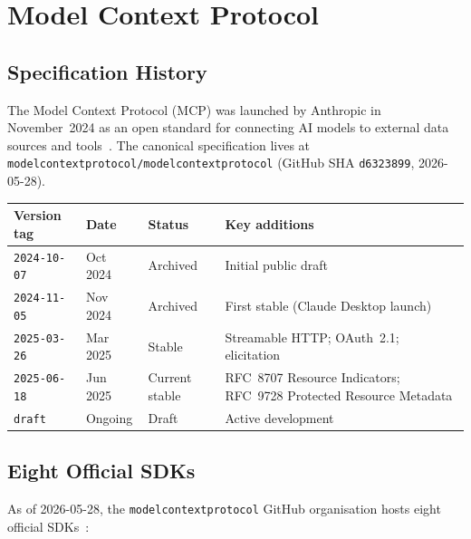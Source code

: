 \section{Model Context Protocol}
\label{sec:mcp}

\subsection{Specification History}
\label{ssec:mcp-spec}

The Model Context Protocol (MCP) was launched by Anthropic in November~2024
as an open standard for connecting AI models to external data sources and
tools~\cite{mcp_ecosystem_deep}.  The canonical specification lives at
\texttt{modelcontextprotocol/modelcontextprotocol}
(GitHub SHA \texttt{d6323899}, 2026-05-28).

\begin{center}
\begin{tabular}{llll}
\textbf{Version tag} & \textbf{Date} & \textbf{Status} & \textbf{Key additions} \\
\hline
\texttt{2024-10-07} & Oct 2024 & Archived & Initial public draft \\
\texttt{2024-11-05} & Nov 2024 & Archived & First stable (Claude Desktop launch) \\
\texttt{2025-03-26} & Mar 2025 & Stable & Streamable HTTP; OAuth~2.1; elicitation \\
\texttt{2025-06-18} & Jun 2025 & Current stable & RFC~8707 Resource Indicators; RFC~9728 Protected Resource Metadata \\
\texttt{draft} & Ongoing & Draft & Active development \\
\end{tabular}
\end{center}

\subsection{Eight Official SDKs}
\label{ssec:mcp-sdks}

As of 2026-05-28, the \texttt{modelcontextprotocol} GitHub organisation
hosts eight official SDKs~\cite{mcp_ecosystem_deep}:

